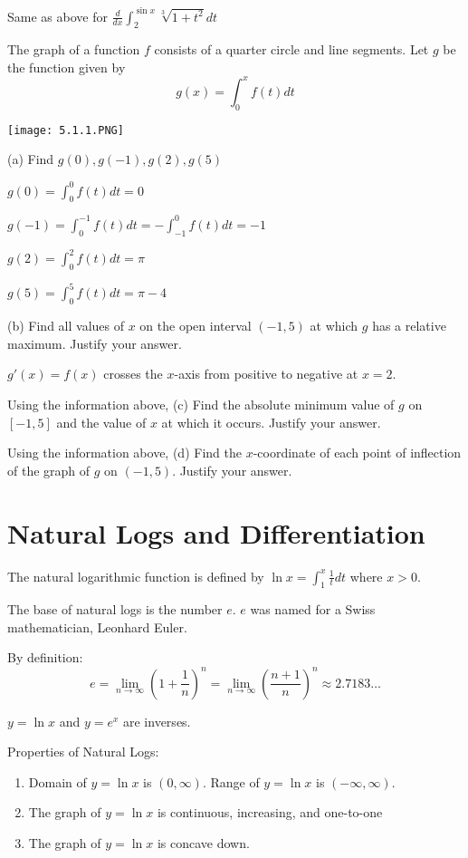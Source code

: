 \documentclass[../bccalc.tex]{subfiles}
\begin{document}
\ex Same as above for $\frac{d}{dx}\int_2^{\sin x}\sqrt[3]{1+t^2}dt$
\pagebreak
\begin{example}
    The graph of a function $f$ consists of a quarter circle and line segments. Let $g$ be the function given by 
    \[ g(x)=\int_0^x f(t)dt \]
    \begin{center}
    \texttt{[image: 5.1.1.PNG]}
\end{center}
(a) Find $g(0), g(-1), g(2), g(5)$

$g(0)=\int_0^0 f(t)dt =0 $

$g(-1)=\int_0^{-1}f(t)dt = -\int_{-1}^0 f(t)dt = -1$

$g(2)=\int_0^2 f(t)dt = \pi$

$g(5) = \int_0^5 f(t)dt = \pi-4$

(b) Find all values of $x$ on the open interval $(-1,5)$ at which $g$ has a relative maximum. Justify your answer.

$g'(x) = f(x)$ crosses the $x$-axis from positive to negative at $x=2$.
\end{example}

\ex Using the information above, (c) Find the absolute minimum value of $g$ on $[-1,5]$ and the value of $x$ at which it occurs. Justify your answer.

\ex Using the information above, (d) Find the $x$-coordinate of each point of inflection of the graph of $g$ on $(-1,5)$. Justify your answer.

\section{Natural Logs and Differentiation}
\begin{definition}
    The natural logarithmic function is defined by $\ln x = \int_1^x \frac{1}{t}dt$ where $x>0$.
\end{definition}

The base of natural logs is the number $e$. $e$ was named for a Swiss mathematician, Leonhard Euler.

By definition: 
\[ e = \lim_{n\to \infty}\left(1+\frac{1}{n}\right)^n = \lim_{n\to \infty}\left(\frac{n+1}{n}\right)^n \approx 2.7183\dots \]

$y=\ln x$ and $y=e^x$ are inverses.

Properties of Natural Logs:
\begin{enumerate}
    \item Domain of $y=\ln x$ is $(0,\infty)$. Range of $y=\ln x$ is $(-\infty,\infty)$.
    \item The graph of $y=\ln x$ is continuous, increasing, and one-to-one 
    \item The graph of $y=\ln x$ is concave down.
\end{enumerate}
\end{document}
